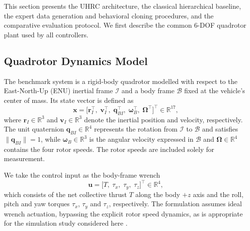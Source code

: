\documentclass[12pt, a4paper]{article}
\begin{document}
This section presents the UHRC architecture, the classical hierarchical baseline, the expert data generation and behavioral cloning procedures, and the comparative evaluation protocol.
We first describe the common 6-DOF quadrotor plant used by all controllers.


%
\subsection{Quadrotor Dynamics Model}
\label{sec:dynamics}

The benchmark system is a rigid-body quadrotor modelled with respect to the East-North-Up (ENU) inertial frame $\mathcal{I}$ and a body frame $\mathcal{B}$ fixed at the vehicle's center of mass.
Its state vector is defined as
\begin{equation}
    \mathbf{x} = \bigl[\mathbf{r}_I^{\top},\;
                        \mathbf{v}_I^{\top},\;
                        \mathbf{q}_{BI}^{\top},\;
                        \boldsymbol{\omega}_B^{\top},\;
                        \boldsymbol{\Omega}^{\top} \bigr]^{\top}
    \in \mathbb{R}^{17},
    \label{eq:state}
\end{equation}
where $\mathbf{r}_I \in \mathbb{R}^3$ and $\mathbf{v}_I \in \mathbb{R}^3$ denote the inertial position and velocity, respectively.
The unit quaternion $\mathbf{q}_{BI} \in \mathbb{R}^4$ represents the rotation from $\mathcal{I}$ to $\mathcal{B}$ and satisfies $\|\mathbf{q}_{BI}\| = 1$, while $\boldsymbol{\omega}_B \in \mathbb{R}^3$ is the angular velocity expressed in $\mathcal{B}$ and $\boldsymbol{\Omega} \in \mathbb{R}^4$ contains the four rotor speeds.
The rotor speeds are included solely for measurement.

We take the control input as the body-frame wrench
\begin{equation}
    \mathbf{u} = \bigl[T,\; \tau_x,\; \tau_y,\; \tau_z\bigr]^{\top}
    \in \mathbb{R}^4,
\end{equation}
which consists of the net collective thrust $T$ along the body $+z$ axis and the roll, pitch and yaw torques $\tau_x$, $\tau_y$ and $\tau_z$, respectively.
The formulation assumes ideal wrench actuation, bypassing the explicit rotor speed dynamics, as is appropriate for the simulation study considered here \parencite{hoffmann_quadrotor_2007}.
\end{document}

